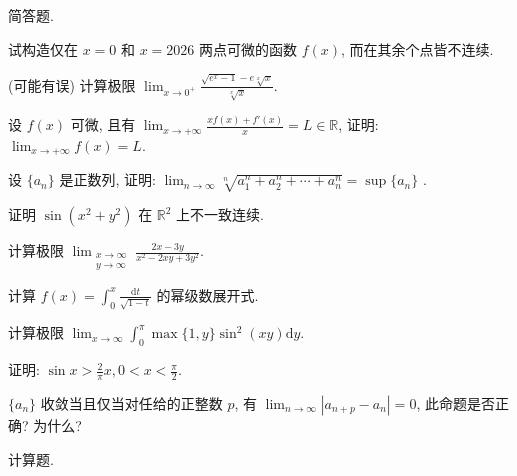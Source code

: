 \par{}
简答题.\par
试构造仅在 $x = 0$ 和 $x = 2026$ 两点可微的函数 $f(x)$, 而在其余个点皆不连续.\par
(可能有误) 计算极限 $\lim_{x\to 0^{+}}\frac{\sqrt{e^x - 1} - e\sqrt[x]{x}}{\sqrt[x]{x}}.$\par
设 $f(x)$ 可微, 且有 $\lim_{x\to +\infty}\frac{xf(x) + f'(x)}{x} = L\in \mathbb{R}$, 证明: $\lim_{x\to +\infty}f(x) = L$.\par
设  $\{a_{n}\}$  是正数列, 证明:  $\lim_{n\to\infty}\sqrt[n]{a_{1}^{n}+a_{2}^{n}+\cdots+a_{n}^{n}}=\sup\{a_{n}\}$ .\par
证明 $\sin (x^2 + y^2)$ 在 $\mathbb{R}^2$ 上不一致连续.\par
计算极限 $\lim_{\substack{x \to \infty \\ y \to \infty}} \frac{2x - 3y}{x^2 - 2xy + 3y^2}$.\par
计算 $f(x) = \int_{0}^{x} \frac{\mathrm{d}t}{\sqrt{1 - t}}$ 的幂级数展开式.\par
计算极限 $\lim_{x\to \infty}\int_0^\pi \max \{1,y\} \sin^2 (xy)\mathrm{d}y.$\par
证明: $\sin x > \frac{2}{\pi} x, 0 < x < \frac{\pi}{2}$.\par
$\{a_{n}\}$ 收敛当且仅当对任给的正整数 $p$, 有 $\lim_{n\to \infty}|a_{n + p} - a_n| = 0$, 此命题是否正确? 为什么?\par
\par{}
计算题.\par
\par{}
